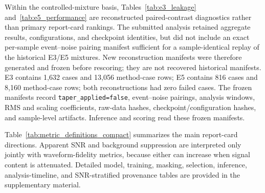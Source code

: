\documentclass[review,12pt,authoryear]{elsarticle}
\begin{document}
Within the controlled-mixture basis, Tables~\ref{tab:e3_leakage} and~\ref{tab:e5_performance} are reconstructed paired-contrast diagnostics rather than primary report-card rankings. The submitted analysis retained aggregate results, configurations, and checkpoint identities, but did not include an exact per-sample event--noise pairing manifest sufficient for a sample-identical replay of the historical E3/E5 mixtures. New reconstruction manifests were therefore generated and frozen before rescoring; they are not recovered historical manifests. E3 contains 1,632 cases and 13,056 method-case rows; E5 contains 816 cases and 8,160 method-case rows; both reconstructions had zero failed cases. The frozen manifests record \texttt{taper\_applied=false}, event--noise pairings, analysis windows, RMS and scaling coefficients, raw-data hashes, checkpoint/configuration hashes, and sample-level artifacts. Inference and scoring read these frozen manifests.

Table~\ref{tab:metric_definitions_compact} summarizes the main report-card directions. Apparent SNR and background suppression are interpreted only jointly with waveform-fidelity metrics, because either can increase when signal content is attenuated. Detailed model, training, masking, selection, inference, analysis-timeline, and SNR-stratified provenance tables are provided in the supplementary material.
\end{document}
